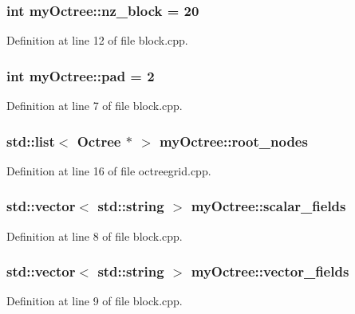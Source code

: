 \subsubsection[{nz\+\_\+block}]{\setlength{\rightskip}{0pt plus 5cm}int my\+Octree\+::nz\+\_\+block = 20}\label{namespacemy_octree_a2b2fa3a7759c3ff5b129847af3e09cc3}


Definition at line 12 of file block.\+cpp.

\hypertarget{namespacemy_octree_afd8ca344b4ea11a79b6154184cdd1eee}{}
\subsubsection[{pad}]{\setlength{\rightskip}{0pt plus 5cm}int my\+Octree\+::pad = 2}\label{namespacemy_octree_afd8ca344b4ea11a79b6154184cdd1eee}


Definition at line 7 of file block.\+cpp.

\hypertarget{namespacemy_octree_a6212186e66a32f5588c044d5ba02dabf}{}
\subsubsection[{root\+\_\+nodes}]{\setlength{\rightskip}{0pt plus 5cm}std\+::list$<$ {\bf Octree} $\ast$ $>$ my\+Octree\+::root\+\_\+nodes}\label{namespacemy_octree_a6212186e66a32f5588c044d5ba02dabf}


Definition at line 16 of file octreegrid.\+cpp.

\hypertarget{namespacemy_octree_a4f17c285302d88a975d981d6d3847e0b}{}
\subsubsection[{scalar\+\_\+fields}]{\setlength{\rightskip}{0pt plus 5cm}std\+::vector$<$ std\+::string $>$ my\+Octree\+::scalar\+\_\+fields}\label{namespacemy_octree_a4f17c285302d88a975d981d6d3847e0b}


Definition at line 8 of file block.\+cpp.

\hypertarget{namespacemy_octree_a2945780283d74e740bfa857e95f7c19a}{}
\subsubsection[{vector\+\_\+fields}]{\setlength{\rightskip}{0pt plus 5cm}std\+::vector$<$ std\+::string $>$ my\+Octree\+::vector\+\_\+fields}\label{namespacemy_octree_a2945780283d74e740bfa857e95f7c19a}


Definition at line 9 of file block.\+cpp.

